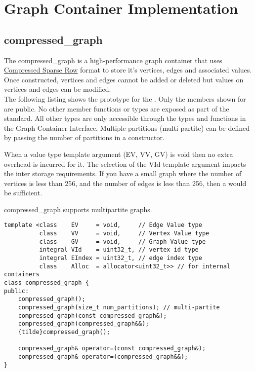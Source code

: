 
\chapter{Graph Container Implementation}

\section{compressed\_graph}
The compressed\_graph is a high-performance graph container that uses \href{https://en.wikipedia.org/wiki/Sparse_matrix#Compressed_sparse_row_\%28CSR\%2C_CRS_or_Yale_format\%29}{Compressed Sparse Row} format to store it's vertices, edges and associated values. Once constructed, vertices and edges cannot be added or deleted but values on vertices and edges can be modified.
\\

The following listing shows the prototype for the . Only the members shown for  are public. 
No other member functions or types are exposed as part of the standard. All other types are only accessible through the types and functions 
in the Graph Container Interface. Multiple partitions (multi-partite) can be defined by passing the number of partitions in a constructor.

When a value type template argument (EV, VV, GV) is void then no extra overhead is incurred for it. 
The selection of the VId template argument impacts the inter storage requirements. If you have a small 
graph where the number of vertices is less than 256, and the number of edges is less than 256, 
then a  would be sufficient.

compressed\_graph supports multipartite graphs.

\begin{lstlisting}
template <class    EV     = void,     // Edge Value type
          class    VV     = void,     // Vertex Value type
          class    GV     = void,     // Graph Value type
          integral VId    = uint32_t, // vertex id type
          integral EIndex = uint32_t, // edge index type
          class    Alloc  = allocator<uint32_t>> // for internal containers
class compressed_graph {
public:
    compressed_graph();
    compressed_graph(size_t num_partitions); // multi-partite
    compressed_graph(const compressed_graph&);
    compressed_graph(compressed_graph&&);
    {tilde}compressed_graph();

    compressed_graph& operator=(const compressed_graph&);
    compressed_graph& operator=(compressed_graph&&);
}
\end{lstlisting}



